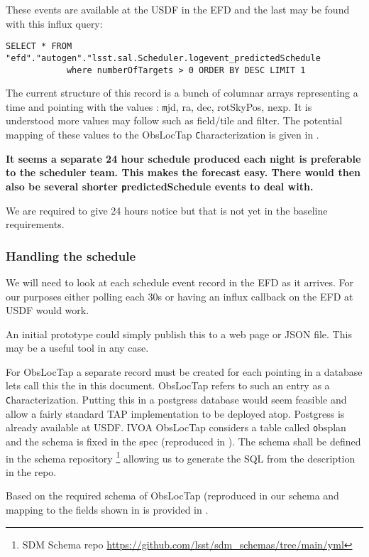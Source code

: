 These events are available at the USDF in the EFD and the last may be found with this influx query:
\begin{lstlisting}
SELECT * FROM "efd"."autogen"."lsst.sal.Scheduler.logevent_predictedSchedule
            where numberOfTargets > 0 ORDER BY DESC LIMIT 1
\end{lstlisting}

The current structure of this record is a bunch of columnar arrays representing a time and pointing with the
values : {\texttt mjd, ra, dec, rotSkyPos, nexp}.
It is understood more values may follow such as field/tile and filter.
The potential mapping of these values to the ObsLocTap {\texttt Characterization} is given in .


{\bf It seems a separate 24 hour schedule produced each night is preferable to the scheduler team. This makes the forecast easy. There would then also be several shorter {\texttt predictedSchedule} events to deal with. }

We are required to give 24 hours notice but that is not yet in the  baseline requirements.
\subsubsection{Handling the schedule}
We will need to look at each schedule event record in the EFD as it arrives.
For our purposes either polling each 30s or having an influx callback on the EFD at USDF would
work.

An initial prototype could simply publish this to a web page or JSON file.
This may be a useful tool in any case.


For ObsLocTap a separate record must be created for each pointing in a database lets call this the \DB in this document.
ObsLocTap refers to such an entry as a {\texttt Characterization}.
Putting this in a postgress database would seem feasible and allow a fairly standard TAP implementation to be deployed atop.
Postgress is already available at USDF.
IVOA ObsLocTap considers a table called {\texttt obsplan} and the schema is fixed in the spec (reproduced in ).
The schema shall be  defined in the schema repository
\footnote{ SDM Schema repo \url{https://github.com/lsst/sdm_schemas/tree/main/yml}}
 allowing us to generate the SQL from the description in the repo.

Based on the required schema of ObsLocTap (reproduced in  our schema and mapping to the fields shown in  is provided in .

